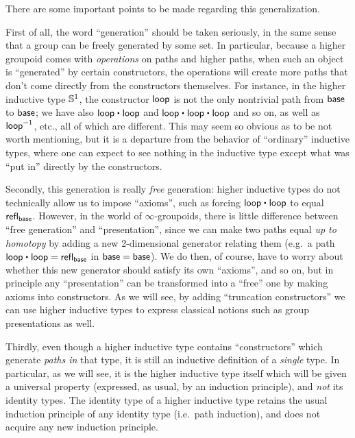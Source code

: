 There are some important points to be made regarding this generalization.

First of all, the word ``generation'' should be taken seriously, in the same sense that a group can be freely generated by some set.
In particular, because a higher groupoid comes with \emph{operations} on paths and higher paths, when such an object is ``generated'' by certain constructors, the operations will create more paths that don't come directly from the constructors themselves.
For instance, in the higher inductive type $\mathbb{S}^1$, the constructor $\mathsf{loop}$ is not the only nontrivial path from $\mathsf{base}$ to $\mathsf{base}$; we have also $\lloop\ct\lloop$ and $\lloop\ct\lloop\ct\lloop$ and so on, as well as $\mathord{{\mathsf{loop}}^{-1}}$, etc., all of which are different.
This may seem so obvious as to be not worth mentioning, but it is a departure from the behavior of ``ordinary'' inductive types, where one can expect to see nothing in the inductive type except what was ``put in'' directly by the constructors.

Secondly, this generation is really \emph{free} generation: higher inductive types do not technically allow us to impose ``axioms'', such as forcing $\lloop\ct\lloop$ to equal $\mathsf{refl}_{\mathsf{base}}$.
However, in the world of $\infty$-groupoids, there is little difference between ``free generation'' and ``presentation'', since we can make two paths equal \emph{up to homotopy} by adding a new 2-dimensional generator relating them (e.g.\ a path $\lloop\ct\lloop = \refl{\base}$ in $\mathsf{base}=\mathsf{base}$).
We do then, of course, have to worry about whether this new generator should satisfy its own ``axioms'', and so on, but in principle any ``presentation'' can be transformed into a ``free'' one by making axioms into constructors.
As we will see, by adding ``truncation constructors'' we can use higher inductive types to express classical notions such as group presentations as well.

Thirdly, even though a higher inductive type contains ``constructors'' which generate \emph{paths in} that type, it is still an inductive definition of a \emph{single} type.
In particular, as we will see, it is the higher inductive type itself which will be given a universal property (expressed, as usual, by an induction principle), and \emph{not} its identity types.
The identity type of a higher inductive type retains the usual induction principle of any identity type (i.e.\ path induction), and does not acquire any new induction principle.

